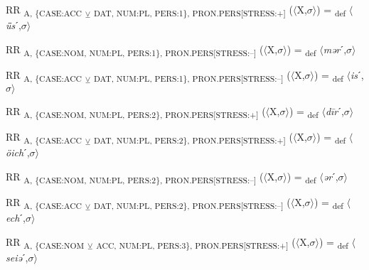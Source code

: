 {\begin{exe}
 RR \textsubscript{A, \{CASE:ACC} \textsubscript{${\veebar}$}\textsubscript{ DAT, NUM:PL, PERS:1\}, PRON.PERS[STRESS:+]} ($\langle$X,$\sigma $$\rangle$) = \textsubscript{def} $\langle$\textit{ǖs}ˊ,$\sigma $$\rangle$
\end{exe}

\begin{exe}
 RR \textsubscript{A, \{CASE:NOM, NUM:PL, PERS:1\}, PRON.PERS[STRESS:–]} ($\langle$X,$\sigma $$\rangle$) = \textsubscript{def} $\langle$\textit{mər}ˊ,$\sigma $$\rangle$
\end{exe}

\begin{exe}
 RR \textsubscript{A, \{CASE:ACC} \textsubscript{${\veebar}$}\textsubscript{ DAT, NUM:PL, PERS:1\}, PRON.PERS[STRESS:–]} ($\langle$X,$\sigma $$\rangle$) = \textsubscript{def} $\langle$\textit{is}ˊ,$\sigma $$\rangle$
\end{exe}

\begin{exe}
 RR \textsubscript{A, \{CASE:NOM, NUM:PL, PERS:2\}, PRON.PERS[STRESS:+]} ($\langle$X,$\sigma $$\rangle$) = \textsubscript{def} $\langle$\textit{d\=ir}ˊ,$\sigma $$\rangle$
\end{exe}

\begin{exe}
 RR \textsubscript{A, \{CASE:ACC} \textsubscript{${\veebar}$}\textsubscript{ DAT, NUM:PL, PERS:2\}, PRON.PERS[STRESS:+]} ($\langle$X,$\sigma $$\rangle$) = \textsubscript{def} $\langle$\textit{öich}ˊ,$\sigma $$\rangle$
\end{exe}

\begin{exe}
 RR \textsubscript{A, \{CASE:NOM, NUM:PL, PERS:2\}, PRON.PERS[STRESS:–]} ($\langle$X,$\sigma $$\rangle$) = \textsubscript{def} $\langle$\textit{ər}ˊ,$\sigma $$\rangle$
\end{exe}

\begin{exe}
 RR \textsubscript{A, \{CASE:ACC} \textsubscript{${\veebar}$}\textsubscript{ DAT, NUM:PL, PERS:2\}, PRON.PERS[STRESS:–]} ($\langle$X,$\sigma $$\rangle$) = \textsubscript{def} $\langle$\textit{ech}ˊ,$\sigma $$\rangle$
\end{exe}

\begin{exe}
 RR \textsubscript{A, \{CASE:NOM} \textsubscript{${\veebar}$}\textsubscript{ ACC, NUM:PL, PERS:3\}, PRON.PERS[STRESS:+]} ($\langle$X,$\sigma $$\rangle$) = \textsubscript{def} $\langle$\textit{seiə}ˊ,$\sigma $$\rangle$
\end{exe}

}
